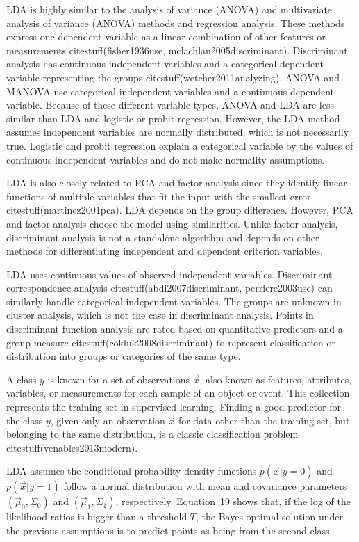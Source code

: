 \documentclass[preprint,12pt]{elsarticle}
\begin{document}
LDA is highly similar to the analysis of variance (ANOVA) and multivariate analysis of variance (ANOVA) methods and regression analysis. These methods express one dependent variable as a linear combination of other features or measurements citestuff(fisher1936use, mclachlan2005discriminant). Discriminant analysis has continuous independent variables and a categorical dependent variable representing the groups citestuff(wetcher2011analyzing). ANOVA and MANOVA use categorical independent variables and a continuous dependent variable. Because of these different variable types, ANOVA and LDA are less similar than LDA and logistic or probit regression. However, the LDA method assumes independent variables are normally distributed, which is not necessarily true. Logistic and probit regression explain a categorical variable by the values of continuous independent variables and do not make normality assumptions.

LDA is also closely related to PCA and factor analysis since they identify linear functions of multiple variables that fit the input with the smallest error citestuff(martinez2001pca). LDA depends on the group difference. However, PCA and factor analysis choose the model using similarities. Unlike factor analysis, discriminant analysis is not a standalone algorithm and depends on other methods for differentiating independent and dependent criterion variables.

LDA uses continuous values of observed independent variables. Discriminant correspondence analysis citestuff(abdi2007discriminant, perriere2003use) can similarly handle categorical independent variables. The groups are unknown in cluster analysis, which is not the case in discriminant analysis. Points in discriminant function analysis are rated based on quantitative predictors and a group measure citestuff(cokluk2008discriminant) to represent classification or distribution into groups or categories of the same type.

A class $y$ is known for a set of observations $\vec{x}$, also known as features, attributes, variables, or measurements for each sample of an object or event. This collection represents the training set in supervised learning. Finding a good predictor for the class $y$, given only an observation $\vec{x}$ for data other than the training set, but belonging to the same distribution, is a classic classification problem citestuff(venables2013modern).

LDA assumes the conditional probability density functions $p({\vec{x}}|y=0)$ and $p({\vec{x}}|y=1)$ follow a normal distribution with mean and covariance parameters $\left({\vec{\mu}}_{0},\Sigma_{0}\right)$ and $\left({\vec{\mu}}_{1},\Sigma_{1}\right)$, respectively. Equation~19 shows that, if the log of the likelihood ratios is bigger than a threshold $T$, the Bayes-optimal solution under the previous assumptions is to predict points as being from the second class.
\end{document}
